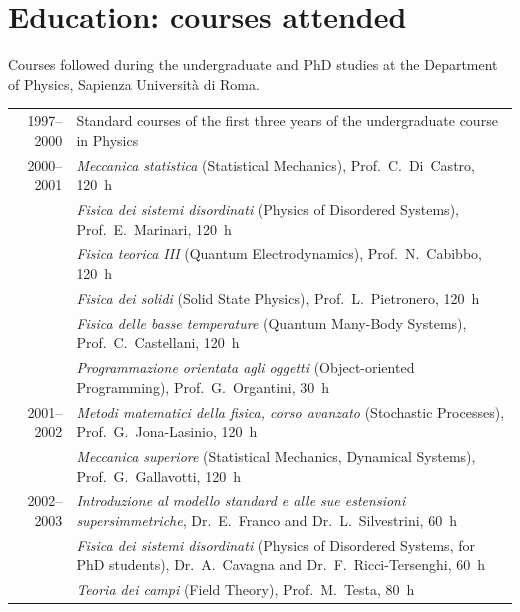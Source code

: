 \documentclass[a4paper,10pt]{article}
\begin{document}
\section{Education: courses attended}

{\small Courses followed during the undergraduate and PhD studies at the Department of Physics, Sapienza Universit\`a di Roma.}

\vspace{8pt}
\begin{tabularx}{\textwidth}{@{}D L@{}}
1997--2000 & Standard courses of the first three years of the undergraduate course in Physics \\
2000--2001 & \emph{Meccanica statistica} (Statistical Mechanics), Prof.~C.~Di~Castro, 120~h \\
 & \emph{Fisica dei sistemi disordinati} (Physics of Disordered Systems), Prof.~E.~Marinari, 120~h \\
 & \emph{Fisica teorica III} (Quantum Electrodynamics), Prof.~N.~Cabibbo, 120~h \\
 & \emph{Fisica dei solidi} (Solid State Physics), Prof.~L.~Pietronero, 120~h \\
 & \emph{Fisica delle basse temperature} (Quantum Many-Body Systems), Prof.~C.~Castellani, 120~h \\
 & \emph{Programmazione orientata agli oggetti} (Object-oriented Programming), Prof.~G.~Organtini, 30~h \\
2001--2002 & \emph{Metodi matematici della fisica, corso avanzato} (Stochastic Processes), Prof.~G.~Jona-Lasinio, 120~h \\
 & \emph{Meccanica superiore} (Statistical Mechanics, Dynamical Systems), Prof.~G.~Gallavotti, 120~h \\
2002--2003 & \emph{Introduzione al modello standard e alle sue estensioni supersimmetriche}, Dr.~E.~Franco and Dr.~L.~Silvestrini, 60~h \\
 & \emph{Fisica dei sistemi disordinati} (Physics of Disordered Systems, for PhD students), Dr.~A.~Cavagna and Dr.~F.~Ricci-Tersenghi, 60~h \\
 & \emph{Teoria dei campi} (Field Theory), Prof.~M.~Testa, 80~h \\
\end{tabularx}
\end{document}
